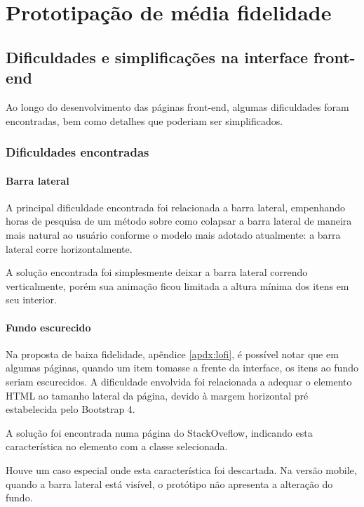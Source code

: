 \section{Prototipação de média fidelidade}

\subsection{Dificuldades e simplificações na interface front-end}

Ao longo do desenvolvimento das páginas front-end, algumas dificuldades foram encontradas, bem como detalhes que poderiam ser simplificados.

\subsubsection{Dificuldades encontradas}

\paragraph{Barra lateral}
A principal dificuldade encontrada foi relacionada a barra lateral, empenhando horas de pesquisa de um método sobre como colapsar a barra lateral de maneira mais natural ao usuário conforme o modelo mais adotado atualmente: a barra lateral corre horizontalmente.

A solução encontrada foi simplesmente deixar a barra lateral correndo verticalmente, porém sua animação ficou limitada a altura mínima dos itens em seu interior.

\paragraph{Fundo escurecido}

Na proposta de baixa fidelidade, apêndice \ref{apdx:lofi}, é possível notar que em algumas páginas, quando um item tomasse a frente da interface, os itens ao fundo seriam escurecidos.
A dificuldade envolvida foi relacionada a adequar o elemento HTML ao tamanho lateral da página, devido à margem horizontal pré estabelecida pelo Bootstrap 4.

A solução foi encontrada numa página do StackOveflow, indicando esta característica no elemento com a classe selecionada.

Houve um caso especial onde esta característica foi descartada.
Na versão mobile, quando a barra lateral está visível, o protótipo não apresenta a alteração do fundo.

